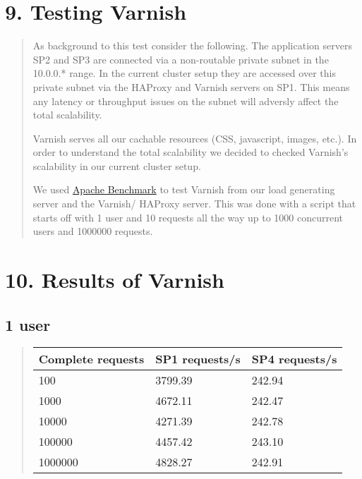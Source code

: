\documentclass[letterpaper,10pt,english]{sphinxmanual}
\begin{document}
\chapter{9. Testing Varnish}
\label{index:testing-varnish}\begin{quote}

As background to this test consider the following.  The application servers
SP2 and SP3 are connected via a non-routable private subnet in the 10.0.0.*
range. In the current cluster setup they are accessed over this private
subnet via the HAProxy and Varnish servers on SP1.  This means any latency
or throughput issues on the subnet will adversly affect the total
scalability.

Varnish serves all our cachable resources (CSS, javascript, images, etc.).
In order to understand the total scalability we decided to checked Varnish's
scalability in our current cluster setup.

We used \href{https://httpd.apache.org/docs/2.2/programs/ab.html}{Apache Benchmark} to test Varnish from our load generating server
and the Varnish/ HAProxy server.  This was done with a script that starts
off with 1 user and 10 requests all the way up to 1000 concurrent users and
1000000 requests.
\end{quote}


\chapter{10. Results of Varnish}
\label{index:results-of-varnish}

\section{1 user}
\label{index:user}\begin{quote}

\begin{tabulary}{\linewidth}{|L|L|L|}
\hline
\textbf{\relax 
Complete requests
} & \textbf{\relax 
SP1 requests/s
} & \textbf{\relax 
SP4 requests/s
}\\\hline

100
 & 
3799.39
 & 
242.94
\\\hline

1000
 & 
4672.11
 & 
242.47
\\\hline

10000
 & 
4271.39
 & 
242.78
\\\hline

100000
 & 
4457.42
 & 
243.10
\\\hline

1000000
 & 
4828.27
 & 
242.91
\\\hline
\end{tabulary}

\end{quote}
\end{document}
